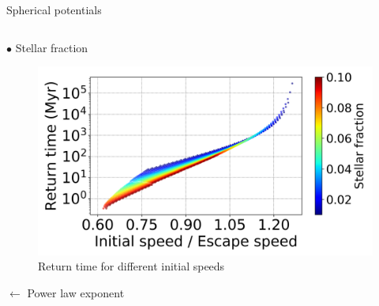 \documentclass[handout]{beamer}
\begin{document}
\begin{frame}{Spherical potentials}
\begin{columns}
\begin{column}{0.7\textwidth}
			\hspace{2cm} $\bullet$ Stellar fraction
			\begin{figure}[h]
				\centering
				\includegraphics[width=0.9\linewidth]{"../Files/Week 10/returntimes_speed_slides"}
				\caption{Return time for different initial speeds}
			\end{figure}
		
			$\longleftarrow$ Power law exponent
		\end{column}
	\end{columns}	
\end{frame}
\end{document}
